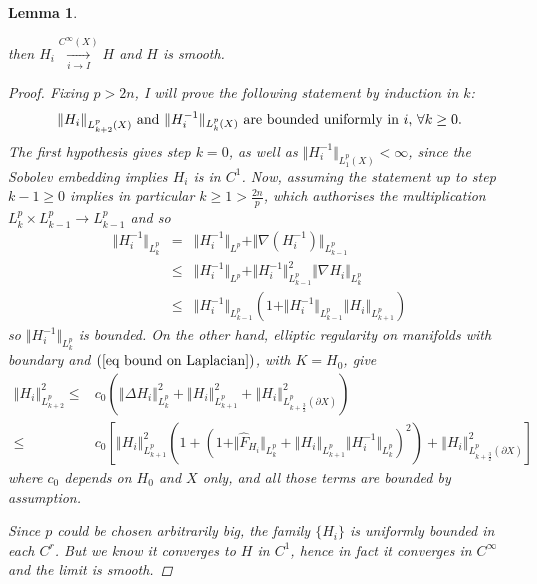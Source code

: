 \documentclass{article}
\newtheorem{lemma}[theorem]{Lemma}
\begin{document}
\begin{lemma}
\begin{enumerate}
\end{enumerate}
then $\displaystyle H_{i}\underset{i\rightarrow I}{\overset{C^\infty(X)}{\longrightarrow }}H$ and $H$ is smooth.
\begin{proof}
Fixing $p>2n$, I will prove the following statement by induction in $k$:%
\begin{equation*}
\begin{tabular}{l}
$\left\Vert H_i\right\Vert _{L_{k+2}^{p}(X)}$ and $\Vert H_i^{-1}\Vert
_{L_{k}^{p}(X)}$ are bounded uniformly in $i$, $\forall k\geq0$.%
\end{tabular}%
\end{equation*}%
The first hypothesis gives step $k=0$, as well as $\Vert H_i^{-1}\Vert
_{L_{1}^{p}(X)}<\infty$, since the Sobolev embedding implies $H_i$ is in $C^1$. Now, assuming the statement up
to step $k-1\geq0$ implies in particular $k\geq1>\frac{2n}{p}$, which authorises the multiplication $L^p_k\times L^p_{k-1}\to L^p_{k-1}$ and so 
\begin{eqnarray*}
        \Vert H_i^{-1}\Vert _{L_{k}^{p}}
        &=&\Vert H_i^{-1}\Vert_{L^{p}}
        +\Vert \nabla \left( H_i^{-1}\right)\Vert_{L_{k-1}^{p}}\\
        &\leq &\Vert H_i^{-1}\Vert _{L^{p}}
        +\Vert H_i^{-1}\Vert_{L_{k-1}^{p}}^{2}
        \Vert \nabla H_i\Vert _{L_{k}^{p}} \\
        &\leq &\Vert H_i^{-1}\Vert _{L_{k-1}^{p}}
        \left( 1+\Vert H_i^{-1}\Vert _{L_{k-1}^{p}}
        \left\Vert H_i\right\Vert _{L_{k+1}^{p}}\right)
\end{eqnarray*}%
so $\Vert H_i^{-1}\Vert _{L_{k}^{p}}$ is bounded. On the other hand,
elliptic regularity on manifolds with boundary and $\left( \ref{eq
bound on Laplacian}\right) $, with $K=H_0$, give%
$$
\begin{array}{rl}
\left\Vert H_i\right\Vert _{L_{k+2}^{p}}^{2} \leq &c_0
        \left(\left\Vert \Delta H_i\right\Vert _{L_{k}^{p}}^{2}
        +\left\Vert H_i\right\Vert_{L_{k+1}^{p}}^{2}
        +\left\Vert H_i\right\Vert _{L_{k+\frac{3}{2}}^{p}
        \left(\partial X\right) }^{2}\right) \\
        \leq &c_0
        \left[ \left\Vert H_i\right\Vert _{L_{k+1}^{p}}^{2}
        \left(1+\left( 1+\Vert \hat{F}_{H_i}\Vert _{L_{k}^{p}}
        +\left\Vert H_i\right\Vert _{L_{k+1}^{p}}
        \Vert H_i^{-1}\Vert _{L_{k}^{p}}\right)^{2}\right)+
        \left\Vert H_i\right\Vert 
        _{L_{k+\frac{3}{2}}^{p}\left( \partial X\right) }^{2} \right]\end{array}
$$
where $c_0$ depends on $H_0$ and $X$ only, and all those terms are bounded by assumption. 

Since $p$ could be chosen arbitrarily big, the family $\{H_{i}\}$ is uniformly bounded in each $C^r$. But we know it converges to $H$ in $C^1$, hence in fact it converges in $C^\infty$ and the limit is
smooth.
\end{proof}
\end{lemma}
\end{document}
